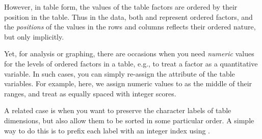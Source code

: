\documentclass[11pt]{book}
\renewenvironment{knitrout}{\small\renewcommand{\baselinestretch}{.85}}{} %
\begin{document}
However, in table form, the values of the table factors are ordered by their position in the table.
Thus in the  data, both  and  represent ordered
factors, and the \emph{positions} of the values in the rows and columns reflects their
ordered nature, but only implicitly.

Yet, for analysis or graphing, there are occasions when you need \emph{numeric} values for the levels
of ordered factors in a table, e.g., to treat a factor as a quantitative variable.
In such cases, you can simply re-assign the  attribute of the table
variables.  For example, here, we assign numeric values to  as the middle of their
ranges, and treat  as equally spaced with integer scores.

\begin{knitrout}
\color{fgcolor}\begin{kframe}
\begin{alltt}
\hlopt{$} \hlkwb{<-} \hlstd{(}\hlstd{,}\hlstd{,}\hlstd{,}\hlstd{)}
\hlopt{$} \hlkwb{<-} \hlopt{:}
\end{alltt}
\end{kframe}
\end{knitrout}

A related case is when you want to preserve the character labels of table dimensions,
but also allow them to be sorted in some particular order. A simple way to do this
is to prefix each label with an integer index using .

\begin{knitrout}
\color{fgcolor}\begin{kframe}
\begin{alltt}
\hlopt{$} \hlkwb{<-} \hlstd{(}\hlopt{:}\hlstd{,} \hlopt{$} \hlstd{=}\hlstd{)}
\hlopt{$} \hlkwb{<-}
                           \hlstd{(}\hlopt{:}\hlstd{,} \hlopt{$} \hlstd{=}\hlstd{)}
\end{alltt}
\end{kframe}
\end{knitrout}
\end{document}

